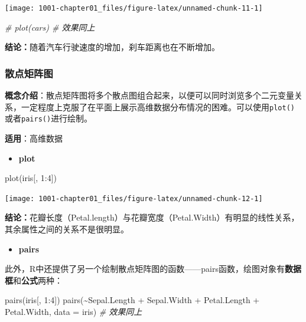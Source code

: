 \documentclass[
]{book}
\newenvironment{Shaded}{\begin{snugshade}}{\end{snugshade}}
\newcommand{\AttributeTok}[1]{\textcolor[rgb]{0.77,0.63,0.00}{#1}}
\newcommand{\CommentTok}[1]{\textcolor[rgb]{0.56,0.35,0.01}{\textit{#1}}}
\newcommand{\DecValTok}[1]{\textcolor[rgb]{0.00,0.00,0.81}{#1}}
\newcommand{\FunctionTok}[1]{\textcolor[rgb]{0.00,0.00,0.00}{#1}}
\newcommand{\NormalTok}[1]{#1}
\newcommand{\SpecialCharTok}[1]{\textcolor[rgb]{0.00,0.00,0.00}{#1}}
\providecommand{\tightlist}{%
  \setlength{\itemsep}{0pt}\setlength{\parskip}{0pt}}
\begin{document}
\begin{center}\texttt{[image: 1001-chapter01\_files/figure-latex/unnamed-chunk-11-1]} \end{center}

\begin{Shaded}
\begin{Highlighting}[]
\CommentTok{\# plot(cars) \# 效果同上}
\end{Highlighting}
\end{Shaded}

\textbf{结论：}随着汽车行驶速度的增加，刹车距离也在不断增加。

\hypertarget{ux6563ux70b9ux77e9ux9635ux56fe}{%
\subsubsection{散点矩阵图}\label{ux6563ux70b9ux77e9ux9635ux56fe}}

\textbf{概念介绍}：散点矩阵图将多个散点图组合起来，以便可以同时浏览多个二元变量关系，一定程度上克服了在平面上展示高维数据分布情况的困难。可以使用\texttt{plot()}或者\texttt{pairs()}进行绘制。

\textbf{适用}：高维数据

\begin{itemize}
\tightlist
\item
  \textbf{plot}
\end{itemize}

\begin{Shaded}
\begin{Highlighting}[]
\FunctionTok{plot}\NormalTok{(iris[, }\DecValTok{1}\SpecialCharTok{:}\DecValTok{4}\NormalTok{])}
\end{Highlighting}
\end{Shaded}

\begin{center}\texttt{[image: 1001-chapter01\_files/figure-latex/unnamed-chunk-12-1]} \end{center}

\textbf{结论：}花瓣长度（Petal.length）与花瓣宽度（Petal.Width）有明显的线性关系，其余属性之间的关系不是很明显。

\begin{itemize}
\tightlist
\item
  \textbf{pairs}
\end{itemize}

此外，R中还提供了另一个绘制散点矩阵图的函数------pairs函数，绘图对象有\textbf{数据框}和\textbf{公式}两种：

\begin{Shaded}
\begin{Highlighting}[]
\FunctionTok{pairs}\NormalTok{(iris[, }\DecValTok{1}\SpecialCharTok{:}\DecValTok{4}\NormalTok{])}
\FunctionTok{pairs}\NormalTok{(}\SpecialCharTok{\textasciitilde{}}\NormalTok{Sepal.Length }\SpecialCharTok{+}\NormalTok{ Sepal.Width }\SpecialCharTok{+}\NormalTok{ Petal.Length }\SpecialCharTok{+}\NormalTok{ Petal.Width, }\AttributeTok{data =}\NormalTok{ iris)  }\CommentTok{\# 效果同上}
\end{Highlighting}
\end{Shaded}
\end{document}
